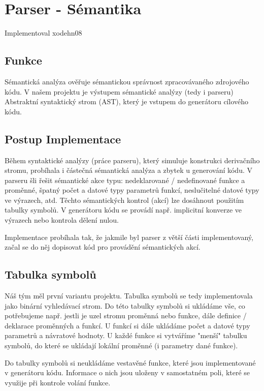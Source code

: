 \documentclass[11pt,a4paper]{article}
\begin{document}
    \newpage



\section{Parser - Sémantika} \label{semantika}
    Implementoval xodehn08

    \subsection{Funkce}
    Sémantická analýza ověřuje sémantickou správnost zpracovávaného zdrojového kódu. V našem projektu je výstupem sémantické analýzy (tedy i parseru) Abstraktní syntaktický strom (AST), který je vstupem do generátoru cílového kódu.

    \subsection{Postup Implementace}
    Během syntaktické analýzy (práce parseru), který simuluje konstrukci derivačního stromu, probíhala i částečná sémantická analýza a zbytek u generování kódu. V parseru šli řešit sémantické akce typu: nedeklarované / nedefinované funkce a proměnné, špatný počet a datové typy parametrů funkcí, neslučitelné datové typy ve výrazech, atd. Těchto sémantických kontrol (akcí) lze dosáhnout použitím tabulky symbolů. V generátoru kódu se provádí např. implicitní konverze ve výrazech nebo kontrola dělení nulou.

    Implementace probíhala tak, že jakmile byl parser z větší části implementovaný, začal se do něj dopisovat kód pro provádění sémantických akcí.

    \subsection{Tabulka symbolů}
    Náš tým měl první variantu projektu. Tabulka symbolů se tedy implementovala jako binární vyhledávací strom. Do této tabulky symbolů si ukládáme vše, co potřebujeme např. jestli je uzel stromu proměnná nebo funkce, dále definice / deklarace proměnných a funkcí. U funkcí si dále ukládáme počet a datové typy parametrů a návratové hodnoty. U každé funkce si vytváříme "menší" tabulku symbolů, do které se ukládají lokální proměnné (i parametry dané funkce).

    Do tabulky symbolů si neukládáme vestavěné funkce, které jsou implementované v generátoru kódu. Informace o nich jsou uloženy v samostatném poli, které se využije při kontrole volání funkce.
\end{document}
